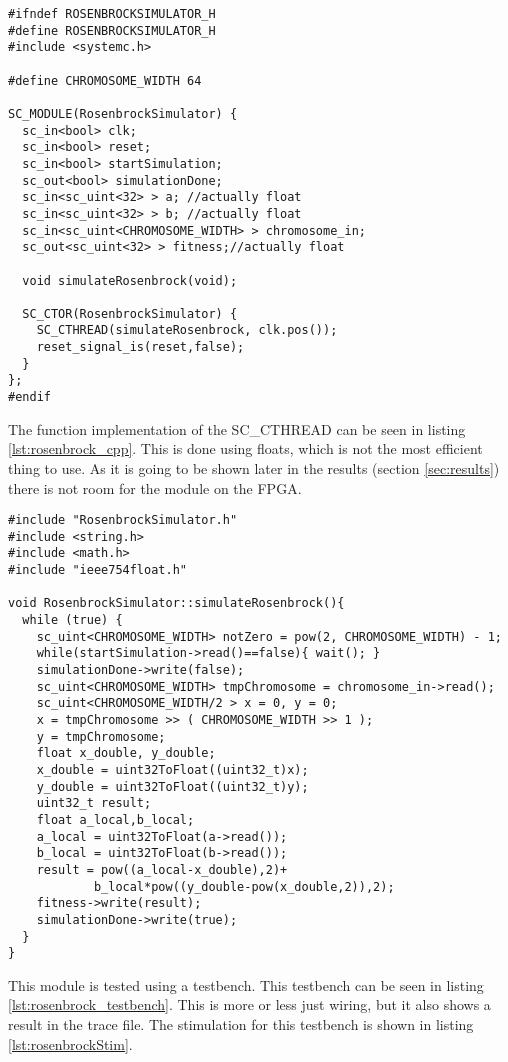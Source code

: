 \begin{lstlisting}[style=customc++,caption={RosenbrockSimulator.h},label={lst:rosenbrock_h}]
#ifndef ROSENBROCKSIMULATOR_H
#define ROSENBROCKSIMULATOR_H
#include <systemc.h>

#define CHROMOSOME_WIDTH 64

SC_MODULE(RosenbrockSimulator) {
  sc_in<bool> clk;
  sc_in<bool> reset;
  sc_in<bool> startSimulation;
  sc_out<bool> simulationDone;
  sc_in<sc_uint<32> > a; //actually float
  sc_in<sc_uint<32> > b; //actually float
  sc_in<sc_uint<CHROMOSOME_WIDTH> > chromosome_in;
  sc_out<sc_uint<32> > fitness;//actually float

  void simulateRosenbrock(void);

  SC_CTOR(RosenbrockSimulator) {
    SC_CTHREAD(simulateRosenbrock, clk.pos());
    reset_signal_is(reset,false);
  }
};
#endif
\end{lstlisting}

The function implementation of the SC\_CTHREAD can be seen in listing \ref{lst:rosenbrock_cpp}. This is done using floats, which is not the most efficient thing to use. As it is going to be shown later in the results (section \ref{sec:results}) there is not room for the module on the FPGA. 

\begin{lstlisting}[style=customc++,caption={RosenbrockSimulator.cpp},label={lst:rosenbrock_cpp}]
#include "RosenbrockSimulator.h"
#include <string.h>
#include <math.h>
#include "ieee754float.h"

void RosenbrockSimulator::simulateRosenbrock(){
  while (true) {
    sc_uint<CHROMOSOME_WIDTH> notZero = pow(2, CHROMOSOME_WIDTH) - 1;
    while(startSimulation->read()==false){ wait(); }
    simulationDone->write(false);
    sc_uint<CHROMOSOME_WIDTH> tmpChromosome = chromosome_in->read();
    sc_uint<CHROMOSOME_WIDTH/2 > x = 0, y = 0;
    x = tmpChromosome >> ( CHROMOSOME_WIDTH >> 1 );
    y = tmpChromosome;
    float x_double, y_double;
    x_double = uint32ToFloat((uint32_t)x);
    y_double = uint32ToFloat((uint32_t)y);
    uint32_t result;
    float a_local,b_local;
    a_local = uint32ToFloat(a->read());
    b_local = uint32ToFloat(b->read());
    result = pow((a_local-x_double),2)+
    		b_local*pow((y_double-pow(x_double,2)),2);
    fitness->write(result);
    simulationDone->write(true);
  }
}
\end{lstlisting}

This module is tested using a testbench. This testbench can be seen in listing \ref{lst:rosenbrock_testbench}. This is more or less just wiring, but it also shows a result in the trace file. The stimulation for this testbench is shown in listing \ref{lst:rosenbrockStim}.




